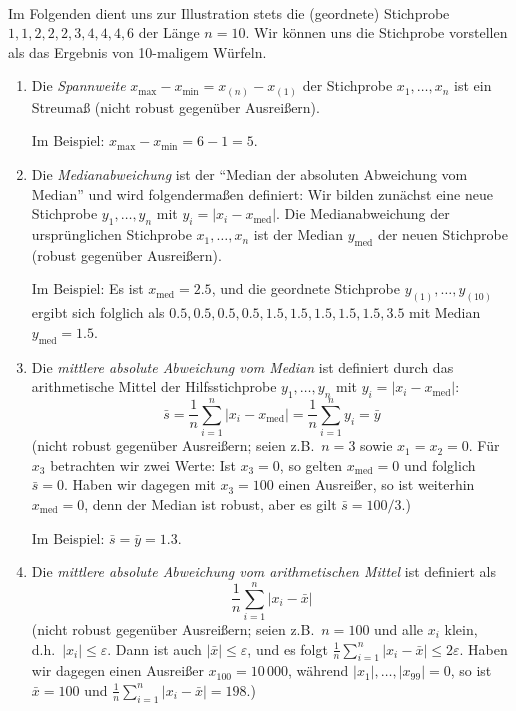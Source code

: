 \begin{bsp}  \\
    Im Folgenden dient uns zur Illustration stets die (geordnete) Stichprobe $1,1,2,2,2,3,4,4,4,6$ der Länge $n=10$.
    Wir können uns die Stichprobe vorstellen als das Ergebnis von 10-maligem Würfeln.

    \begin{enumerate}[label=(\alph*)]
        \item Die \emph{Spannweite} $x_{\max}-x_{\min} = x_{(n)}-x_{(1)}$ der Stichprobe $x_1,\dots,x_n$ ist ein \gls{Streumaß} (nicht robust gegenüber Ausreißern).

        Im Beispiel: $x_{\max}-x_{\min} = 6-1=5$.

        \item Die \emph{Medianabweichung} ist der ``Median der absoluten Abweichung vom Median'' und wird folgendermaßen definiert: Wir bilden zunächst eine neue Stichprobe $y_1,\dots,y_n$ mit $y_i = |x_i-x_{\mathrm{med}}|$.
        Die Medianabweichung der ursprünglichen Stichprobe $x_1,\dots,x_n$ ist der Median $y_{\mathrm{med}}$ der neuen Stichprobe (robust gegenüber Ausreißern).

        Im Beispiel: Es ist $x_{\mathrm{med}}=2.5$, und die geordnete Stichprobe $y_{(1)},\dots,y_{(10)}$ ergibt sich folglich als $0.5,0.5,0.5,0.5,1.5,1.5,1.5,1.5,1.5,3.5$ mit Median $y_{\mathrm{med}}=1.5$.

        \item Die \emph{mittlere absolute Abweichung vom Median} ist definiert durch das arithmetische Mittel der Hilfsstichprobe $y_1,\dots,y_n$ mit $y_i=|x_i-x_{\mathrm{med}}|$:
        \[
            \bar s = \frac1n\sum_{i=1}^n |x_i-x_{\mathrm{med}}| = \frac1n\sum_{i=1}^n y_i = \bar y
        \]
        (nicht robust gegenüber Ausreißern; seien z.B.\ $n=3$ sowie $x_1=x_2=0$.
        Für $x_3$ betrachten wir zwei Werte: Ist $x_3=0$, so gelten $x_{\mathrm{med}}=0$ und folglich $\bar s=0$.
        Haben wir dagegen mit $x_3=100$ einen Ausreißer, so ist weiterhin $x_{\mathrm{med}}=0$, denn der Median ist robust, aber es gilt $\bar s = 100/3$.)

        Im Beispiel: $\bar s = \bar y = 1.3$.

        \item Die \emph{mittlere absolute Abweichung vom arithmetischen Mittel} ist definiert als
        \[
            \frac1n\sum_{i=1}^n |x_i-\bar x|
        \]
        (nicht robust gegenüber Ausreißern; seien z.B.\ $n=100$ und alle $x_i$ klein, d.h.\ $|x_i|\leq\varepsilon$.
        Dann ist auch $|\bar x|\leq\varepsilon$, und es folgt $\frac1n\sum_{i=1}^n|x_i-\bar x|\leq2\varepsilon$.
        Haben wir dagegen einen Ausreißer $x_{100}=10\,000$, während $|x_1|,\dots,|x_{99}|=0$, so ist $\bar x=100$ und $\frac1n\sum_{i=1}^n|x_i-\bar x|=198$.)


\end{enumerate}
\end{bsp}
